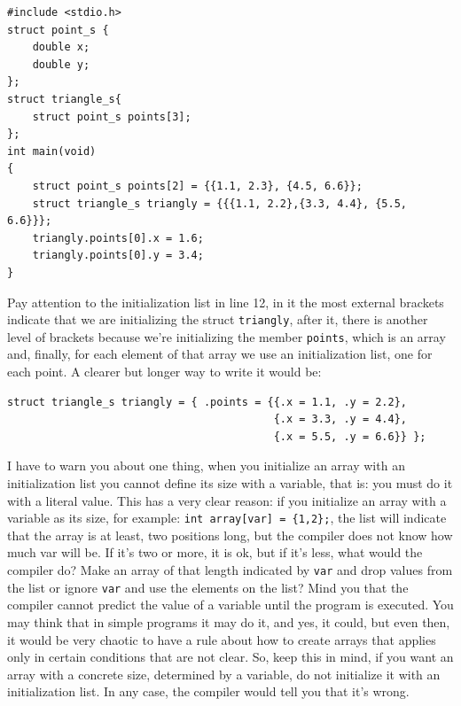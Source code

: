 \documentclass[a4paper]{article}
\begin{document}
\noindent
\begin{minipage}[H]{\linewidth}
\mbox{}
\begin{lstlisting}[style=C,
caption={Combinación \textit{struct} con array},
label={lst:exampleArrayStruct}]
#include <stdio.h>
struct point_s {
    double x;
    double y;
};
struct triangle_s{
    struct point_s points[3];
};
int main(void)
{
    struct point_s points[2] = {{1.1, 2.3}, {4.5, 6.6}};
    struct triangle_s triangly = {{{1.1, 2.2},{3.3, 4.4}, {5.5, 6.6}}};
    triangly.points[0].x = 1.6;
    triangly.points[0].y = 3.4;
}
\end{lstlisting}
\end{minipage}

Pay attention to the initialization list in line 12, in it the most external
brackets indicate that we are initializing the struct \texttt{triangly}, after it,
there is another level of brackets because we're initializing the member
\verb"points", which is an array and, finally, for each element of that array
we use an initialization list, one for each point. A clearer but longer way to
write it would be:

\noindent
\begin{minipage}[H]{\linewidth}
\begin{lstlisting}[style=C]
struct triangle_s triangly = { .points = {{.x = 1.1, .y = 2.2},
                                          {.x = 3.3, .y = 4.4},
                                          {.x = 5.5, .y = 6.6}} };
\end{lstlisting}
\end{minipage}

I have to warn you about one thing, when you initialize an array with an
initialization list you cannot define its size with a variable, that is:
you must do it with a literal value. This has a very clear reason: if you
initialize an array with a variable as its size, for example:
\verb!int array[var] = {1,2};!, the list will indicate that the array is at
least, two positions long, but the compiler does not know how much var will be.
If it's two or more, it is ok, but if it's less, what would the compiler do?
Make an array of that length indicated by \verb"var" and drop values from the
list or ignore \verb!var! and use the elements on the list? Mind you that
the compiler cannot predict the value of a variable until the program is
executed. You may think that in simple programs it may do it, and yes, it could,
but even then, it would be very chaotic to have a rule about how to create
arrays that applies only in certain conditions that are not clear. So, keep this
in mind, if you want an array with a concrete size, determined by a variable,
do not initialize it with an initialization list. In any case, the compiler
would tell you that it's wrong.
\end{document}
